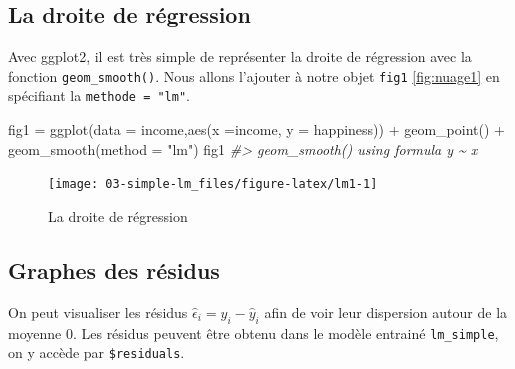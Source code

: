 \documentclass[
]{book}
\newenvironment{Shaded}{\begin{snugshade}}{\end{snugshade}}
\newcommand{\AttributeTok}[1]{\textcolor[rgb]{0.77,0.63,0.00}{#1}}
\newcommand{\CommentTok}[1]{\textcolor[rgb]{0.56,0.35,0.01}{\textit{#1}}}
\newcommand{\FunctionTok}[1]{\textcolor[rgb]{0.00,0.00,0.00}{#1}}
\newcommand{\NormalTok}[1]{#1}
\newcommand{\OtherTok}[1]{\textcolor[rgb]{0.56,0.35,0.01}{#1}}
\newcommand{\SpecialCharTok}[1]{\textcolor[rgb]{0.00,0.00,0.00}{#1}}
\newcommand{\StringTok}[1]{\textcolor[rgb]{0.31,0.60,0.02}{#1}}
\begin{document}
\hypertarget{la-droite-de-ruxe9gression}{%
\subsection{La droite de régression}\label{la-droite-de-ruxe9gression}}

Avec ggplot2, il est très simple de représenter la droite de régression
avec la fonction \texttt{geom\_smooth()}. Nous allons l'ajouter à notre objet
\texttt{fig1} \ref{fig:nuage1} en spécifiant la \texttt{methode\ =\ "lm"}.

\begin{Shaded}
\begin{Highlighting}[]
\NormalTok{fig1 }\OtherTok{=} \FunctionTok{ggplot}\NormalTok{(}\AttributeTok{data =}\NormalTok{ income,}\FunctionTok{aes}\NormalTok{(}\AttributeTok{x =}\NormalTok{income, }\AttributeTok{y =}\NormalTok{ happiness)) }\SpecialCharTok{+}
               \FunctionTok{geom\_point}\NormalTok{() }\SpecialCharTok{+} \FunctionTok{geom\_smooth}\NormalTok{(}\AttributeTok{method =} \StringTok{"lm"}\NormalTok{)}
\NormalTok{fig1}
\CommentTok{\#\textgreater{} \textasciigrave{}geom\_smooth()\textasciigrave{} using formula \textquotesingle{}y \textasciitilde{} x\textquotesingle{}}
\end{Highlighting}
\end{Shaded}

\begin{figure}

{\centering \texttt{[image: 03-simple-lm\_files/figure-latex/lm1-1]} 

}

\caption{La droite de régression}\label{fig:lm1}
\end{figure}

\hypertarget{graphes-des-ruxe9sidus}{%
\subsection{Graphes des résidus}\label{graphes-des-ruxe9sidus}}

On peut visualiser les résidus \(\hat\epsilon_i = y_i -\hat y_i\) afin de
voir leur dispersion autour de la moyenne \(0\). Les résidus peuvent être
obtenu dans le modèle entrainé \texttt{lm\_simple}, on y accède par
\texttt{\$residuals}.
\end{document}
